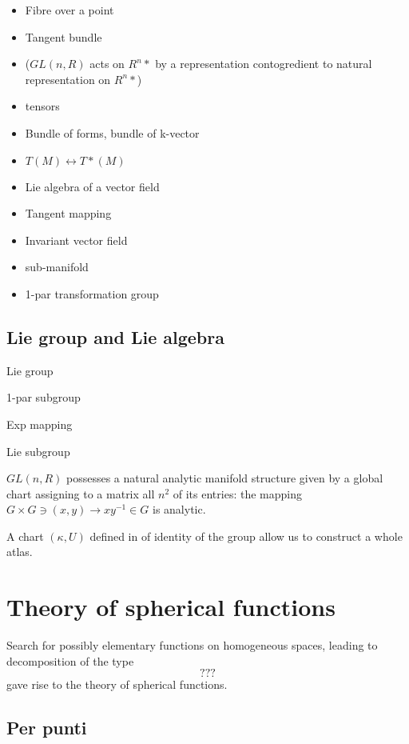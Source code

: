 \documentclass[oneside,12pt]{memoir}
\begin{document}
\begin{itemize}
\item Fibre over a point
\item Tangent bundle
\item ($GL(n,R)$ acts on $R^n*$ by a representation contogredient to natural representation on $R^n*$)
\item tensors
\item Bundle of forms, bundle of k-vector
\item $T(M)\leftrightarrow T*(M)$
\item Lie algebra of a vector field
\item Tangent mapping
\item Invariant vector field
\item sub-manifold
\item 1-par transformation group
\end{itemize}

\section{Lie group and Lie algebra}

\begin{itemize*}
\item Lie group
\item 1-par subgroup
\item Exp mapping
\item Lie subgroup
\item $GL(n,R)$ possesses a natural analytic manifold structure given by a global chart assigning to a matrix all $n^2$ of its entries: the mapping $G\times G\ni(x,y)\to xy^{-1}\in G$ is analytic.
\item A chart $(\kappa, U)$ defined in \nhd{} of identity of the group allow us to construct a whole atlas.
\end{itemize*}

\chapter{Theory of spherical functions}
\PartialToc

Search for possibly elementary functions on homogeneous spaces, leading to decomposition of the type 
\begin{equation*}
???
\end{equation*}
gave rise to the theory of spherical functions.


\section{Per punti}
\end{document}
